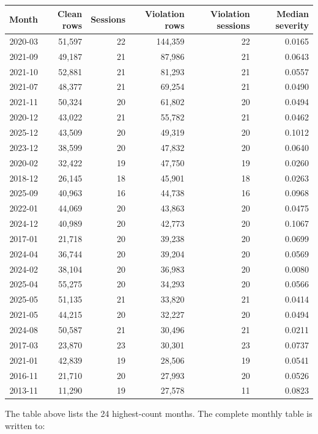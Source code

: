 \documentclass[11pt]{article}
\begin{document}
\begingroup
\scriptsize
\begin{longtable}{rrrrrr}
\toprule
Month & Clean rows & Sessions & Violation rows & Violation sessions & Median severity \\
\midrule
2020-03 & 51,597 & 22 & 144,359 & 22 & 0.0165 \\
2021-09 & 49,187 & 21 & 87,986 & 21 & 0.0643 \\
2021-10 & 52,881 & 21 & 81,293 & 21 & 0.0557 \\
2021-07 & 48,377 & 21 & 69,254 & 21 & 0.0490 \\
2021-11 & 50,324 & 20 & 61,802 & 20 & 0.0494 \\
2020-12 & 43,022 & 21 & 55,782 & 21 & 0.0462 \\
2025-12 & 43,509 & 20 & 49,319 & 20 & 0.1012 \\
2023-12 & 38,599 & 20 & 47,832 & 20 & 0.0640 \\
2020-02 & 32,422 & 19 & 47,750 & 19 & 0.0260 \\
2018-12 & 26,145 & 18 & 45,901 & 18 & 0.0263 \\
2025-09 & 40,963 & 16 & 44,738 & 16 & 0.0968 \\
2022-01 & 44,069 & 20 & 43,863 & 20 & 0.0475 \\
2024-12 & 40,989 & 20 & 42,773 & 20 & 0.1067 \\
2017-01 & 21,718 & 20 & 39,238 & 20 & 0.0699 \\
2024-04 & 36,744 & 20 & 39,204 & 20 & 0.0569 \\
2024-02 & 38,104 & 20 & 36,983 & 20 & 0.0080 \\
2025-04 & 55,275 & 20 & 34,293 & 20 & 0.0566 \\
2025-05 & 51,135 & 21 & 33,820 & 21 & 0.0414 \\
2021-05 & 44,215 & 20 & 32,227 & 20 & 0.0494 \\
2024-08 & 50,587 & 21 & 30,496 & 21 & 0.0211 \\
2017-03 & 23,870 & 23 & 30,301 & 23 & 0.0737 \\
2021-01 & 42,839 & 19 & 28,506 & 19 & 0.0541 \\
2016-11 & 21,710 & 20 & 27,993 & 20 & 0.0526 \\
2013-11 & 11,290 & 19 & 27,578 & 11 & 0.0823 \\
\bottomrule
\end{longtable}
\endgroup

The table above lists the 24 highest-count months. The complete monthly table is
written to:
\begin{quote}
\small{}
\end{quote}
\end{document}
